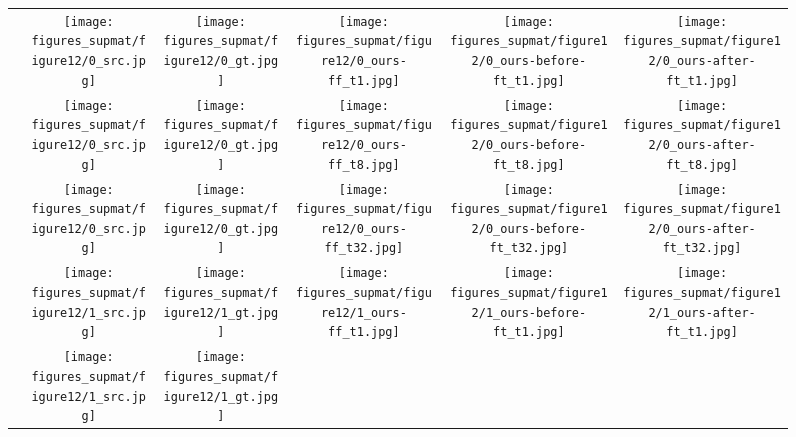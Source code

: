 \documentclass[10pt,twocolumn,letterpaper]{article}
\begin{document}
\begin{figure*}
    \centering    
    \setlength{\wid}{0.179\textwidth}
    \addtolength{\tabcolsep}{-4pt}
    \begin{tabular}{m{0.6cm}c:cccc}
        &
        \texttt{[image: figures\_supmat/figure12/0\_src.jpg]}
        \;&\;
        \texttt{[image: figures\_supmat/figure12/0\_gt.jpg]}&
        \texttt{[image: figures\_supmat/figure12/0\_ours-ff\_t1.jpg]}&
        \texttt{[image: figures\_supmat/figure12/0\_ours-before-ft\_t1.jpg]}&
        \texttt{[image: figures\_supmat/figure12/0\_ours-after-ft\_t1.jpg]}\\
        &
        \texttt{[image: figures\_supmat/figure12/0\_src.jpg]}
        \;&\;
        \texttt{[image: figures\_supmat/figure12/0\_gt.jpg]}&
        \texttt{[image: figures\_supmat/figure12/0\_ours-ff\_t8.jpg]}&
        \texttt{[image: figures\_supmat/figure12/0\_ours-before-ft\_t8.jpg]}&
        \texttt{[image: figures\_supmat/figure12/0\_ours-after-ft\_t8.jpg]}\\
        &
        \texttt{[image: figures\_supmat/figure12/0\_src.jpg]}
        \;&\;
        \texttt{[image: figures\_supmat/figure12/0\_gt.jpg]}&
        \texttt{[image: figures\_supmat/figure12/0\_ours-ff\_t32.jpg]}&
        \texttt{[image: figures\_supmat/figure12/0\_ours-before-ft\_t32.jpg]}&
        \texttt{[image: figures\_supmat/figure12/0\_ours-after-ft\_t32.jpg]}\\
        &
        \texttt{[image: figures\_supmat/figure12/1\_src.jpg]}
        \;&\;
        \texttt{[image: figures\_supmat/figure12/1\_gt.jpg]}&
        \texttt{[image: figures\_supmat/figure12/1\_ours-ff\_t1.jpg]}&
        \texttt{[image: figures\_supmat/figure12/1\_ours-before-ft\_t1.jpg]}&
        \texttt{[image: figures\_supmat/figure12/1\_ours-after-ft\_t1.jpg]}\\
        &
        \texttt{[image: figures\_supmat/figure12/1\_src.jpg]}
        \;&\;
        \texttt{[image: figures\_supmat/figure12/1\_gt.jpg]}&

\end{tabular}
\end{figure*}
\end{document}
